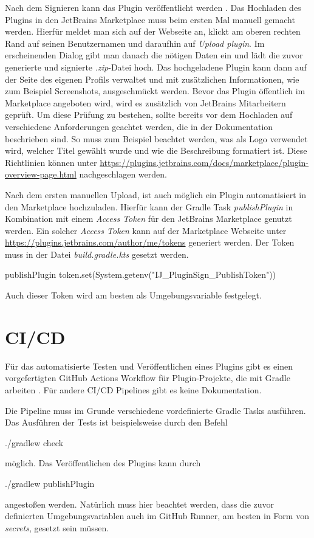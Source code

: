 Nach dem Signieren kann das Plugin veröffentlicht werden
\cite{IntelliJPlatformSDKPublishingAPlugin}.
Das Hochladen des Plugins in den JetBrains Marketplace muss beim ersten Mal
manuell gemacht werden. Hierfür meldet man sich auf der Webseite an,
klickt am oberen rechten Rand auf seinen Benutzernamen und daraufhin
auf \emph{Upload plugin}. Im erscheinenden Dialog gibt man
danach die nötigen Daten ein und lädt die zuvor generierte und signierte
\emph{.zip}-Datei hoch.
Das hochgeladene Plugin kann dann auf der Seite des eigenen Profils
verwaltet und mit zusätzlichen Informationen, wie zum Beispiel Screenshots,
ausgeschmückt werden.
Bevor das Plugin öffentlich im Marketplace angeboten wird, wird es 
zusätzlich von JetBrains Mitarbeitern geprüft. Um diese Prüfung
zu bestehen, sollte bereits vor dem Hochladen auf verschiedene
Anforderungen geachtet werden, die in der Dokumentation beschrieben sind.
So muss zum Beispiel beachtet werden, was als Logo verwendet wird, welcher
Titel gewählt wurde und wie die Beschreibung formatiert ist.
Diese Richtlinien können unter \url{https://plugins.jetbrains.com/docs/marketplace/plugin-overview-page.html}
nachgeschlagen werden.

Nach dem ersten manuellen Upload, ist auch möglich ein
Plugin automatisiert in den Marketplace hochzuladen. Hierfür
kann der Gradle Task \emph{publishPlugin} in Kombination
mit einem \emph{Access Token} für den JetBrains Marketplace genutzt werden.
Ein solcher \emph{Access Token} kann auf der Marketplace Webseite
unter \url{https://plugins.jetbrains.com/author/me/tokens} generiert werden.
Der Token muss in der Datei \emph{build.gradle.kts} gesetzt werden.
\begin{JsCode}[numbers=none]
    publishPlugin {
        token.set(System.getenv("IJ_PluginSign_PublishToken"))
    }
\end{JsCode}
Auch dieser Token wird am besten als Umgebungsvariable festgelegt.


\section{CI/CD}
\label{sec:EntwicklungIntelliJ_CICD}

Für das automatisierte Testen und Veröffentlichen eines Plugins
gibt es einen vorgefertigten GitHub Actions Workflow für 
Plugin-Projekte, die mit Gradle arbeiten \cite{IntelliJGitHubBuildWorkflow}.
Für andere CI/CD Pipelines gibt es keine Dokumentation.

Die Pipeline muss im Grunde verschiedene vordefinierte Gradle Tasks
ausführen. Das Ausführen der Tests ist beispielsweise durch den Befehl
\begin{GenericCode}[numbers=none]
    ./gradlew check
\end{GenericCode}
möglich. Das Veröffentlichen des Plugins kann durch
\begin{GenericCode}[numbers=none]
    ./gradlew publishPlugin 
\end{GenericCode}
angestoßen werden.
Natürlich muss hier beachtet werden, dass die zuvor definierten
Umgebungsvariablen auch im GitHub Runner, 
am besten in Form von \emph{secrets}, gesetzt sein müssen.